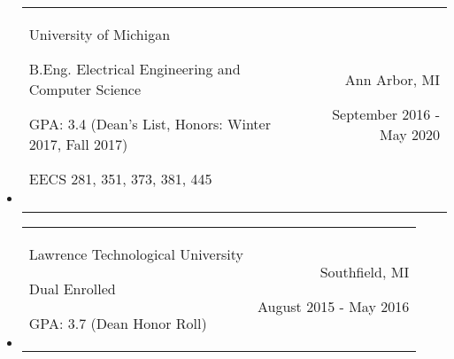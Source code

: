 \documentclass[9pt]{memoir}
\begin{document}
\begin{itemize}

\item

\begin{tabular}[t]{lr}

\begin{minipage}[t]{0.6 \textwidth}
\raggedright

\normalsize
University of Michigan

\small

B.Eng. Electrical Engineering and Computer Science

GPA: 3.4 (Dean's List, Honors: Winter 2017, Fall 2017)

EECS 281, 351, 373, 381, 445
\end{minipage}

&

\begin{minipage}[t]{0.3 \textwidth}
\raggedleft

\normalsize
Ann Arbor, MI

\small
September 2016 - May 2020
\end{minipage}

\\ \\

\end{tabular}

\item

\begin{tabular}[t]{lr}

\begin{minipage}[t]{0.6 \textwidth}
\raggedright

\normalsize
Lawrence Technological University

\small

Dual Enrolled

GPA: 3.7 (Dean Honor Roll)
\end{minipage}

&

\begin{minipage}[t]{0.3 \textwidth}
\raggedleft

\normalsize
Southfield, MI

\small
August 2015 - May 2016
\end{minipage}

\\

\end{tabular}

\end{itemize}
\end{document}

